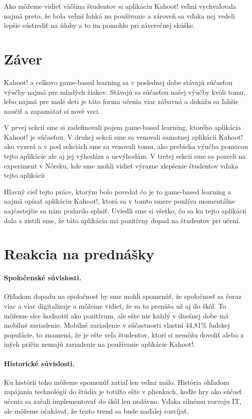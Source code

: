 \documentclass[10pt,oneside,slovak,a4paper]{article}
\begin{document}
Ako môžeme vidieť väčšina študentov si aplikáciu Kahoot! veľmi vychvaľovala najmä preto, že bola veľmi ľahká na používanie a zároveň sa vďaka nej  vedeli lepšie sústrediť na úlohy a to im pomohlo pri záverečnej skúške.
\bigskip

\section*{Záver} \label{zaver} 

Kahoot! a celkovo game-based learning sa v poslednej dobe stávajú súčasťou výučby najmä pre mladých žiakov. Stávajú sa súčasťou našej výučby kvôli tomu, lebo najmä pre malé deti je táto forma učenia viac zábavná a dokážu sa ľahšie naučiť a zapamätať si nové veci.

V prvej sekcii sme si zadefinovali pojem game-based learning, ktorého aplikácia Kahoot! je súčasťou. V druhej sekcii sme sa venovali samotnej aplikácii Kahoot! ako vyzerá a v pod sekciách sme sa venovali tomu, ako prebieha výučba pomocou tejto aplikácie ale aj jej výhodám a nevýhodám. V tretej sekcii sme sa pozreli na experiment v Nórsku, kde sme mohli vidieť výrazne zlepšenie študentov vďaka tejto aplikácii

Hlavný cieľ tejto práce, ktorým bolo povedať čo je to game-based learning a najmä opísať aplikáciu Kahoot!, ktorá sa v tomto smere používa momentálne najčastejšie sa nám podarilo splniť. Uviedli sme si všetko, čo sa ku tejto aplikácii dalo a zistili sme, že táto aplikácia má pozitívny dopad na študentov pri učení. 



\section*{Reakcia na prednášky}
\paragraph{Spoločenské súvislosti.}
Ohľadom dopadu na spoločnosť by sme mohli spomenúť, že spoločnosť sa čoraz viac a viac digitalizuje a môžeme vidieť, že sa to prenáša už aj do škôl. To môžeme síce hodnotiť ako pozitívum, ale ešte nie každý v dnešnej dobe má mobilné zariadenie. Mobilné zariadenie v súčastnosti vlastní 44,81\% ľudskej populácie\cite{Turner2020}, to znamená, že je ešte veľa študentov, ktorí si nemôžu dovoliť alebo z iných príčin nemajú zariadenie na používanie aplikácie Kahoot!. 
\paragraph{Historické súvislosti.}
Ku histórii toho môžeme spomenúť zatiaľ len veľmi málo. História ohľadom zapájania technológii do štúdia je totižto ešte v plienkach, keďže hry ako súčasť učenia sa začali implementovať do škôl len nedávno. Vďaka silnému rozvoju IT, ale môžeme očakávať, že tento trend sa bude naďalej rozvíjať. 
\end{document}
